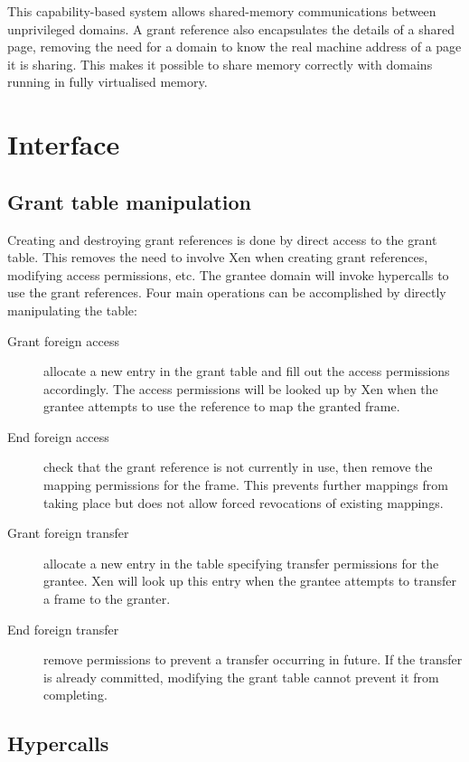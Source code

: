 \documentclass[11pt,twoside,final,openright,a4paper]{report}
\begin{document}
This capability-based system allows shared-memory communications
between unprivileged domains.  A grant reference also encapsulates the
details of a shared page, removing the need for a domain to know the
real machine address of a page it is sharing.  This makes it possible
to share memory correctly with domains running in fully virtualised
memory.

\section{Interface}

\subsection{Grant table manipulation}

Creating and destroying grant references is done by direct access to
the grant table.  This removes the need to involve Xen when creating
grant references, modifying access permissions, etc.  The grantee
domain will invoke hypercalls to use the grant references.  Four main
operations can be accomplished by directly manipulating the table:

\begin{description}
\item[Grant foreign access] allocate a new entry in the grant table
  and fill out the access permissions accordingly.  The access
  permissions will be looked up by Xen when the grantee attempts to
  use the reference to map the granted frame.
\item[End foreign access] check that the grant reference is not
  currently in use, then remove the mapping permissions for the frame.
  This prevents further mappings from taking place but does not allow
  forced revocations of existing mappings.
\item[Grant foreign transfer] allocate a new entry in the table
  specifying transfer permissions for the grantee.  Xen will look up
  this entry when the grantee attempts to transfer a frame to the
  granter.
\item[End foreign transfer] remove permissions to prevent a transfer
  occurring in future.  If the transfer is already committed,
  modifying the grant table cannot prevent it from completing.
\end{description}

\subsection{Hypercalls}
\end{document}
